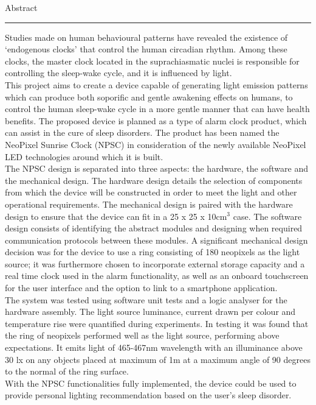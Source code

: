 {\Large Abstract}\\
\hrule
\vskip 10mm

Studies made on human behavioural patterns have revealed the existence of ‘endogenous clocks’ that control the human circadian rhythm. Among these clocks, the master clock located in the suprachiasmatic nuclei is responsible for controlling the sleep-wake cycle, and it is influenced by light.\\

This project aims to create a device capable of generating light emission patterns which can produce both soporific and gentle awakening effects on humans, to control the human sleep-wake cycle in a more gentle manner that can have health benefits. The proposed device is planned as a type of alarm clock product, which can assist in the cure of sleep disorders. The product has been named the NeoPixel Sunrise Clock (NPSC) in consideration of the newly available NeoPixel LED technologies around which it is built.\\

The NPSC design is separated into three aspects: the hardware, the software and the mechanical design. The hardware design details the selection of components from which the device will be constructed in order to meet the light and other operational requirements. The mechanical design is paired with the hardware design to ensure that the device can fit in a 25 x 25 x 10cm$^3$ case. The software design consists of identifying the abstract modules and designing when required communication protocols between these modules. A significant mechanical design decision was for the device to use a ring consisting of 180 neopixels as the light source; it was furthermore chosen to incorporate external storage capacity and a real time clock used in the alarm functionality, as well as an onboard touchscreen for the user interface and the option to link to a smartphone application.\\

The system was tested using software unit tests and a logic analyser for the hardware assembly. The light source luminance, current drawn per colour and temperature rise were quantified during experiments. In testing it was found that the ring of neopixels performed well as the light source, performing above expectations. It emits light of 465-467nm wavelength with an illuminance above 30 lx on any objects placed at maximum of 1m at a maximum angle of 90 degrees to the normal of the ring surface.\\

With the NPSC functionalities fully implemented, the device could be used to provide personal lighting recommendation based on the user's sleep disorder.